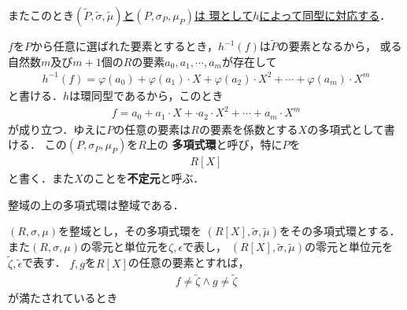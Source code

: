 	\begin{prf}
	\end{prf}
	
	またこのとき\underline{$(\tilde{P},\tilde{\sigma},\tilde{\mu})$と$(P,\sigma_P,\mu_P)$は
	環として$h$によって同型に対応する}．
	
	\begin{prf}
	\end{prf}
	
	$f$を$P$から任意に選ばれた要素とするとき，$h^{-1}(f)$は$\tilde{P}$の要素となるから，
	或る自然数$m$及び$m+1$個の$R$の要素$a_0,a_1,\cdots,a_m$が存在して
	\begin{align}
		h^{-1}(f) = \varphi(a_0) + \varphi(a_1) \cdot X + \varphi(a_2) \cdot X^2 + \cdots + \varphi(a_m) \cdot X^m
	\end{align}
	と書ける．$h$は環同型であるから，このとき
	\begin{align}
		f = a_0 + a_1 \cdot X + \cdot a_2 \cdot X^2 + \cdots + a_m \cdot X^m
	\end{align}
	が成り立つ．ゆえに$P$の任意の要素は$R$の要素を係数とする$X$の多項式として書ける．
	この$(P,\sigma_P,\mu_P)$を$R$上の
	{\bf 多項式環}と呼び，特に$P$を
	\begin{align}
		R[X]
	\end{align}
	と書く．また$X$のことを{\bf 不定元}と呼ぶ．
	
	\begin{screen}
		\begin{thm}[整域上の多項式環は整域]
			整域の上の多項式環は整域である．
		\end{thm}
	\end{screen}
	
	\begin{prf}
		$(R,\sigma,\mu)$を整域とし，その多項式環を
		$\left( R[X],\tilde{\sigma},\tilde{\mu} \right)$をその多項式環とする．
		また$(R,\sigma,\mu)$の零元と単位元を$\zeta,\epsilon$で表し，
		$\left( R[X],\tilde{\sigma},\tilde{\mu} \right)$の零元と単位元を
		$\tilde{\zeta},\tilde{\epsilon}$で表す．
		$f,g$を$R[X]$の任意の要素とすれば，
		\begin{align}
			f \neq \tilde{\zeta} \wedge g \neq \tilde{\zeta}
		\end{align}
		が満たされているとき
		
		
	\end{prf}
	
	\begin{screen}
		\begin{thm}[体の上の多項式環はEuclid整域]
		\end{thm}
	\end{screen}
	
	\begin{screen}
		\begin{thm}[Euclid整域は単項イデアル整域]
		\end{thm}
	\end{screen}